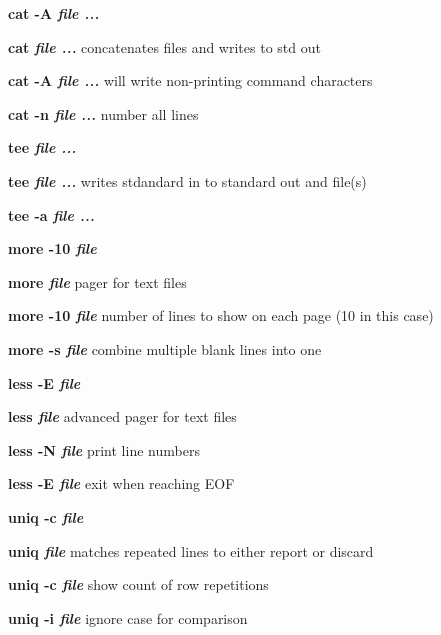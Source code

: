 \documentclass[a4paper,11pt,twoside]{article}
\begin{document}
\vspace{1mm}

\begin{labeling}{\textbf{cat -A \textit{file ...}}}
\item [\textbf{cat \textit{file ...}}] concatenates files and writes to std out
\item [\textbf{cat -A \textit{file ...}}] will write non-printing command characters
\item [\textbf{cat -n \textit{file ...}}] number all lines
\end{labeling}

\vspace{1mm}

\begin{labeling}{\textbf{tee \textit{file ...}}}
\item [\textbf{tee \textit{file ...}}] writes stdandard in to standard out and file(s)
\item [\textbf{tee -a \textit{file ...}}]
\end{labeling}

\vspace{1mm}

\begin{labeling}{\textbf{more -10 \textit{file}}}
\item [\textbf{more \textit{file}}] pager for text files
\item [\textbf{more -10 \textit{file}}] number of lines to show on each page (10 in this case)
\item [\textbf{more -s \textit{file}}] combine multiple blank lines into one
\end{labeling}

\vspace{1mm}

\begin{labeling}{\textbf{less -E \textit{file}}}
\item [\textbf{less \textit{file}}] advanced pager for text files
\item [\textbf{less -N \textit{file}}] print line numbers 
\item [\textbf{less -E \textit{file}}] exit when reaching EOF
\end{labeling}

\vspace{1mm}

\begin{labeling}{\textbf{uniq -c \textit{file}}}
\item [\textbf{uniq \textit{file}}] matches repeated lines to either report or discard
\item [\textbf{uniq -c \textit{file}}] show count of row repetitions 
\item [\textbf{uniq -i \textit{file}}] ignore case for comparison
\end{labeling}
\end{document}
